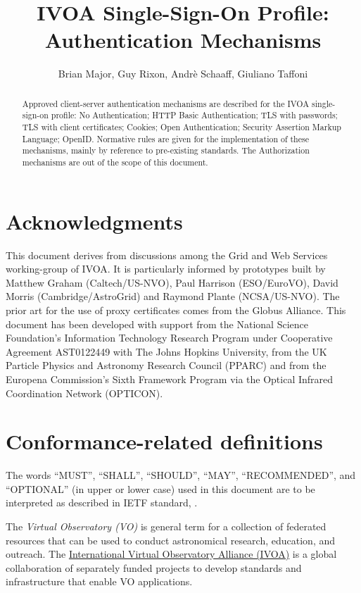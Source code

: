 \documentclass[11pt,a4paper]{ivoa}
\title{IVOA Single-Sign-On Profile: Authentication Mechanisms}
\author{Brian Major, Guy Rixon, Andr\`e Schaaff, Giuliano Taffoni}
\begin{document}
\begin{abstract}
Approved client-server authentication mechanisms are described for the IVOA single-sign-on profile: No Authentication; HTTP Basic Authentication; TLS with passwords; TLS with client certificates; Cookies; Open Authentication; Security Assertion Markup Language; OpenID. Normative rules are given for the implementation of these mechanisms, mainly by reference to pre-existing standards. The Authorization mechanisms are out of the scope of this document.
\end{abstract}


\section*{Acknowledgments}

This document derives from discussions among the Grid and Web Services working-group of IVOA. It is particularly informed by prototypes built by Matthew Graham (Caltech/US-NVO), Paul Harrison (ESO/EuroVO), David Morris (Cambridge/AstroGrid) and Raymond Plante (NCSA/US-NVO). The prior art for the use of proxy certificates comes from the Globus Alliance.
This document has been developed with support from the National Science Foundation's Information Technology Research Program under Cooperative Agreement AST0122449 with The Johns Hopkins University, from the UK Particle Physics and Astronomy Research Council (PPARC) and from the Europena Commission's Sixth Framework Program via the Optical Infrared Coordination Network (OPTICON).


\section*{Conformance-related definitions}
The words ``MUST'', ``SHALL'', ``SHOULD'', ``MAY'', ``RECOMMENDED'', and
``OPTIONAL'' (in upper or lower case) used in this document are to be
interpreted as described in IETF standard, \citet{std:RFC2119}.

The \emph{Virtual Observatory (VO)} is
general term for a collection of federated resources that can be used
to conduct astronomical research, education, and outreach.
The \href{http://www.ivoa.net}{International
Virtual Observatory Alliance (IVOA)} is a global
collaboration of separately funded projects to develop standards and
infrastructure that enable VO applications.
\end{document}
